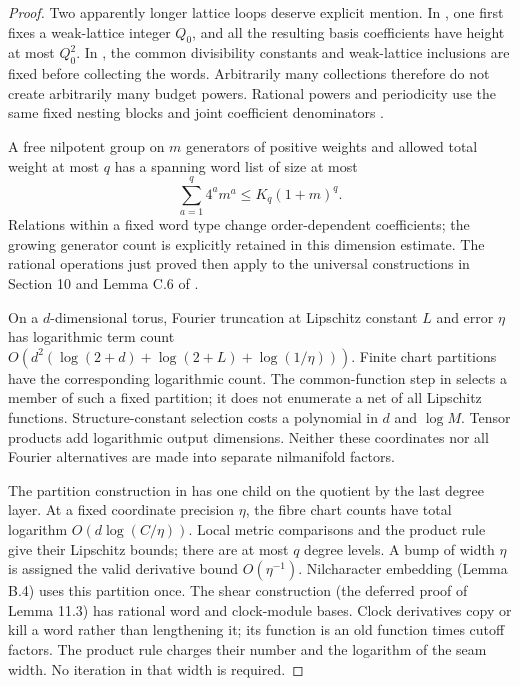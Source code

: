 \documentclass[11pt,a4paper]{article}
\theoremstyle{definition}
\begin{document}
\begin{proof}
Two apparently longer lattice loops deserve explicit mention.
In \cite[Lemma B.11]{leng}, one first fixes a weak-lattice integer
\(Q_0\), and all the resulting basis coefficients have height at
most \(Q_0^2\). In \cite[Lemma 10.4]{lss}, the common divisibility
constants and weak-lattice inclusions are fixed before collecting
the words. Arbitrarily many collections therefore do not create
arbitrarily many budget powers. Rational powers and periodicity use
the same fixed nesting blocks and joint coefficient denominators
\cite[Lemmas B.13--B.14]{leng}.

A free nilpotent group on \(m\) generators of positive weights and
allowed total weight at most \(q\) has a spanning word list of size
at most
\[
 \sum_{a=1}^q 4^a m^a\le K_q(1+m)^q.
\]
Relations within a fixed word type change order-dependent
coefficients; the growing generator count is explicitly retained
in this dimension estimate. The rational operations just proved
then apply to the universal constructions in Section 10 and
Lemma C.6 of \cite{lss}.

On a \(d\)-dimensional torus, Fourier truncation at Lipschitz
constant \(L\) and error \(\eta\) has logarithmic term count
\(O(d^2(\log(2+d)+\log(2+L)+\log(1/\eta)))\).
Finite chart partitions have the corresponding logarithmic count.
The common-function step in \cite[Lemma 6.2]{lss} selects a member
of such a fixed partition; it does not enumerate a net of all
Lipschitz functions. Structure-constant selection costs a polynomial
in \(d\) and \(\log M\). Tensor products add logarithmic output
dimensions. Neither these coordinates nor all Fourier alternatives
are made into separate nilmanifold factors.

The partition construction in \cite[Lemma B.3]{lss} has one child
on the quotient by the last degree layer. At a fixed coordinate
precision \(\eta\), the fibre chart counts have total logarithm
\(O(d\log(C/\eta))\). Local metric comparisons and the product
rule give their Lipschitz bounds; there are at most \(q\) degree
levels. A bump of width \(\eta\) is assigned the valid derivative
bound \(O(\eta^{-1})\). Nilcharacter embedding (Lemma B.4) uses
this partition once. The shear construction (the deferred proof
of Lemma 11.3) has rational word and clock-module bases. Clock
derivatives copy or kill a word rather than lengthening it; its
function is an old function times cutoff factors. The product
rule charges their number and the logarithm of the seam width.
No iteration in that width is required.


\end{proof}
\end{document}
